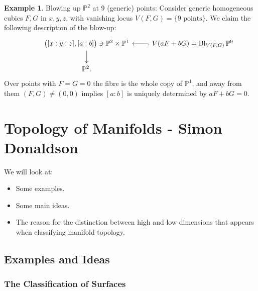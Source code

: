 \documentclass{article}
\theoremstyle{definition}
\newtheorem*{example}{Example}
\DeclareMathOperator{\Bl}{Bl}
\renewcommand{\P}{\mathbb{P}}
\begin{document}
\begin{example}
    Blowing up $\P^2$ at 9 (generic) points: Consider generic homogeneous cubics
    $F,G$ in $x,y,z$, with vanishing locus $V(F,G)=\{\text{9 points}\}$. We
    claim the following description of the blow-up:
    \begin{equation*}
        \begin{tikzcd}
            &\bigl([x:y:z],[a:b]\bigr)\ni\P^2\times\P^1 \ar[d]
            &V(aF+bG)=\Bl_{V(F,G)}\P^9 \ar[l,hook] \\
            &\P^2.
        \end{tikzcd}
    \end{equation*}
    Over points with $F=G=0$ the fibre is the whole copy of $\P^1$, and away
    from them $(F,G)\ne(0,0)$ implies $[a:b]$ is uniquely determined by
    $aF+bG=0$.
\end{example}

\newpage

\section{Topology of Manifolds - Simon Donaldson}

We will look at:
\begin{itemize}
    \item Some examples.
    \item Some main ideas.
    \item The reason for the distinction between high and low dimensions that
        appears when classifying manifold topology.
\end{itemize}

\subsection{Examples and Ideas}

\subsubsection*{The Classification of Surfaces}
\end{document}
